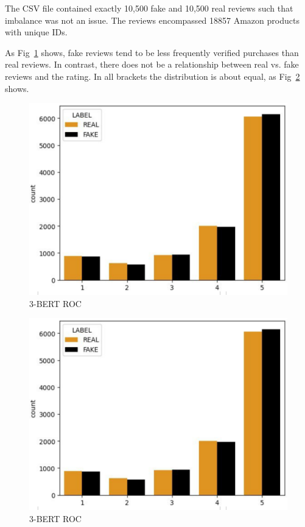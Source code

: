 \documentclass{article}
\begin{document}
The CSV file contained exactly 10,500 fake and 10,500 real reviews such that imbalance was not an issue.
The reviews encompassed 18857 Amazon products with unique IDs.

As Fig~\ref{fig:verified} shows, fake reviews tend to be less frequently verified purchases than real reviews. In contrast, there does not be a relationship between real vs. fake reviews and the rating. In all brackets the distribution is about equal, as Fig~\ref{fig:rating} shows.

\begin{figure}[htb]
  \centering
  \includegraphics[width=\linewidth]{./rating.png}
  \caption{3-BERT ROC}
  \label{fig:verified}
\end{figure}

\begin{figure}[htb]
  \centering
  \includegraphics[width=\linewidth]{./rating.png}
  \caption{3-BERT ROC}
  \label{fig:rating}
\end{figure}
\end{document}
